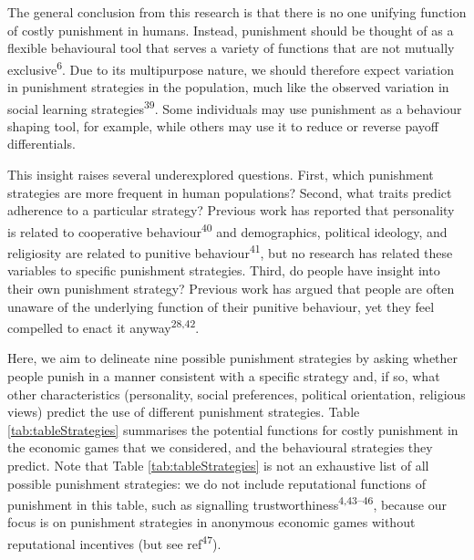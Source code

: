 \documentclass[
  english,
  man, donotrepeattitle,floatsintext]{apa6}
\begin{document}
The general conclusion from this research is that there is no one unifying
function of costly punishment in humans. Instead, punishment should be thought
of as a flexible behavioural tool that serves a variety of functions that are
not mutually exclusive\textsuperscript{6}. Due to its multipurpose nature, we should
therefore expect variation in punishment strategies in the population, much like
the observed variation in social learning strategies\textsuperscript{39}. Some
individuals may use punishment as a behaviour shaping tool, for example, while
others may use it to reduce or reverse payoff differentials.

This insight raises several underexplored questions. First, which punishment
strategies are more frequent in human populations? Second, what traits predict
adherence to a particular strategy? Previous work has reported that personality
is related to cooperative behaviour\textsuperscript{40} and demographics, political
ideology, and religiosity are related to punitive behaviour\textsuperscript{41}, but
no research has related these variables to specific punishment strategies.
Third, do people have insight into their own punishment strategy? Previous work
has argued that people are often unaware of the underlying function of their
punitive behaviour, yet they feel compelled to enact it anyway\textsuperscript{28,42}.

Here, we aim to delineate nine possible punishment strategies by asking
whether people punish in a manner consistent with a specific strategy and, if
so, what other characteristics (personality, social preferences, political
orientation, religious views) predict the use of different punishment strategies.
Table \ref{tab:tableStrategies} summarises the potential functions for costly
punishment in the economic games that we considered, and the behavioural
strategies they predict. Note that Table \ref{tab:tableStrategies} is not
an exhaustive list of all possible punishment strategies: we do not include
reputational functions of punishment in this table, such as signalling
trustworthiness\textsuperscript{4,43--46},
because our focus is on punishment strategies in anonymous economic games without
reputational incentives (but see ref\textsuperscript{47}).
\end{document}
